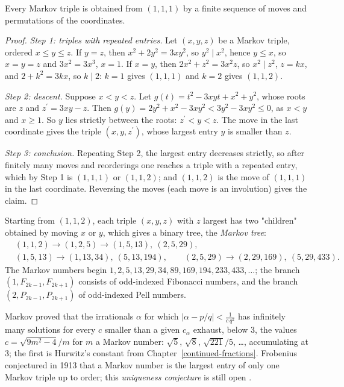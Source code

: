 \begin{theorem}[Markov]\label{diophantine-equations:theorem-markov}
Every Markov triple is obtained from $(1, 1, 1)$ by a finite sequence of moves and permutations of the coordinates.
\end{theorem}

\begin{proof}
\emph{Step 1: triples with repeated entries.} Let $(x, y, z)$ be a Markov triple, ordered $x \leq y \leq z$. If $y = z$, then $x^2 + 2y^2 = 3xy^2$, so $y^2 \mid x^2$, hence $y \leq x$, so $x = y = z$ and
$3x^2 = 3x^3$, $x = 1$. If $x = y$, then $2x^2 + z^2 = 3x^2z$, so $x^2 \mid z^2$, $z = kx$, and $2 + k^2 = 3kx$, so $k \mid 2$: $k = 1$ gives $(1, 1, 1)$ and $k = 2$ gives $(1, 1, 2)$.

\emph{Step 2: descent.} Suppose $x < y < z$. Let $g(t) = t^2 - 3xyt + x^2 + y^2$, whose roots are $z$ and $z^{\prime} = 3xy - z$. Then
$g(y) = 2y^2 + x^2 - 3xy^2 < 3y^2 - 3xy^2 \leq 0$, as $x < y$ and $x \geq 1$. So $y$ lies strictly between the roots: $z^{\prime} < y < z$. The move in the last coordinate gives the triple $(x, y, z^{\prime})$,
whose largest entry $y$ is smaller than $z$.

\emph{Step 3: conclusion.} Repeating Step 2, the largest entry decreases strictly, so after finitely many moves and reorderings one reaches a triple with a repeated entry, which by Step 1 is $(1, 1, 1)$ or
$(1, 1, 2)$; and $(1, 1, 2)$ is the move of $(1, 1, 1)$ in the last coordinate. Reversing the moves (each move is an involution) gives the claim.
\end{proof}

\begin{example}\label{diophantine-equations:example-markov}
Starting from $(1, 1, 2)$, each triple $(x, y, z)$ with $z$ largest has two "children" obtained by moving $x$ or $y$, which gives a binary tree, the \emph{Markov tree}:
\[
\begin{aligned}
&(1, 1, 2) \to (1, 2, 5) \to (1, 5, 13),\ (2, 5, 29), \\
&(1, 5, 13) \to (1, 13, 34),\ (5, 13, 194), \qquad (2, 5, 29) \to (2, 29, 169),\ (5, 29, 433).
\end{aligned}
\]
The Markov numbers begin $1, 2, 5, 13, 29, 34, 89, 169, 194, 233, 433, \dots$; the branch $(1, F_{2k - 1}, F_{2k + 1})$ consists of odd-indexed Fibonacci numbers, and the branch $(2, P_{2k - 1}, P_{2k + 1})$ of
odd-indexed Pell numbers.
\end{example}

\begin{remark}\label{diophantine-equations:remark-markov}
Markov proved that the irrationals $\alpha$ for which $|\alpha - p/q| < \frac{1}{c\,q^2}$ has infinitely many solutions for every $c$ smaller than a given $c_\alpha$ exhaust, below $3$, the values
$c = \sqrt{9m^2 - 4}/m$ for $m$ a Markov number: $\sqrt5$, $\sqrt8$, $\sqrt{221}/5$, \dots, accumulating at $3$; the first is Hurwitz's constant from Chapter~\ref{continued-fractions}. Frobenius conjectured
in 1913 that a Markov number is the largest entry of only one Markov triple up to order; this \emph{uniqueness conjecture} is still open \cite{aigner-markov}.
\end{remark}

